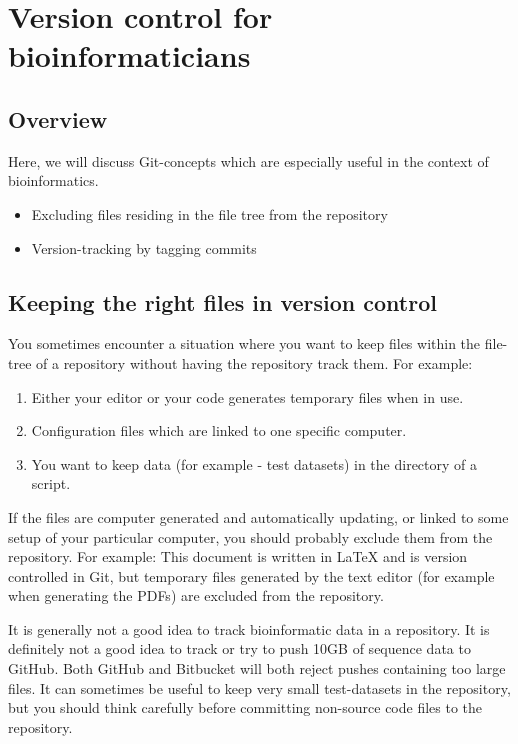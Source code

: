\documentclass[../main/git_course_main.tex]{subfiles}
\begin{document}
\setcounter{chapter}{5}
\chapter{Version control for bioinformaticians}


\section{Overview}

Here, we will discuss Git-concepts which are especially useful in the
context of bioinformatics.

\begin{itemize}
	\item Excluding files residing in the file tree from the repository
	\item Version-tracking by tagging commits
\end{itemize}

\section{Keeping the right files in version control}

You sometimes encounter a situation where you want to keep files within the file-tree of a repository without having the repository track them. For example:

\begin{enumerate}
	\item Either your editor or your code generates temporary files when in use.
	\item Configuration files which are linked to one specific computer.
	\item You want to keep data (for example - test datasets) in the directory of a script.
\end{enumerate}

If the files are computer generated and automatically updating, or linked to some setup of your particular computer, you should probably exclude them from the repository. For example: This document is written in LaTeX and is version controlled in Git, but temporary files generated by the text editor (for example when generating the PDFs) are excluded from the repository.

It is generally not a good idea to track bioinformatic data in a repository. It is definitely not a good idea to track or try to push 10GB of sequence data to GitHub. Both GitHub and Bitbucket will both reject pushes containing too large files. It can sometimes
be useful to keep very small test-datasets in the repository, but you should think carefully before committing non-source code files to the repository.
\end{document}
